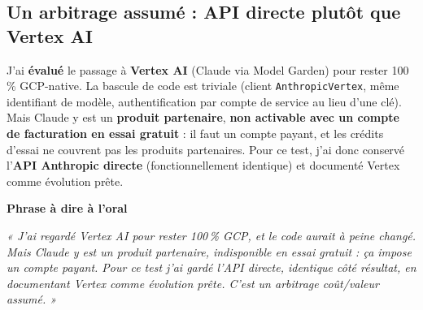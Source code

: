 \documentclass[11pt,a4paper]{article}
\newcommand{\phrasea}[1]{%
  \begin{phrasebox}
  {\bfseries\color{gefblue}\textsf{Phrase à dire à l'oral}}\par\smallskip
  \itshape #1
  \end{phrasebox}%
}
\begin{document}
\subsection{Un arbitrage assumé : API directe plutôt que Vertex AI}
J'ai \textbf{évalué} le passage à \textbf{Vertex AI} (Claude via Model Garden) pour rester
100\,\% GCP-native. La bascule de code est triviale (client \texttt{AnthropicVertex}, même
identifiant de modèle, authentification par compte de service au lieu d'une clé). Mais
Claude y est un \textbf{produit partenaire}, \textbf{non activable avec un compte de
facturation en essai gratuit} : il faut un compte payant, et les crédits d'essai ne
couvrent pas les produits partenaires. Pour ce test, j'ai donc conservé l'\textbf{API
Anthropic directe} (fonctionnellement identique) et documenté Vertex comme évolution prête.

\phrasea{« J'ai regardé Vertex AI pour rester 100\,\% GCP, et le code aurait à peine changé.
Mais Claude y est un produit partenaire, indisponible en essai gratuit : ça impose un compte
payant. Pour ce test j'ai gardé l'API directe, identique côté résultat, en documentant
Vertex comme évolution prête. C'est un arbitrage coût/valeur assumé. »}
\end{document}
